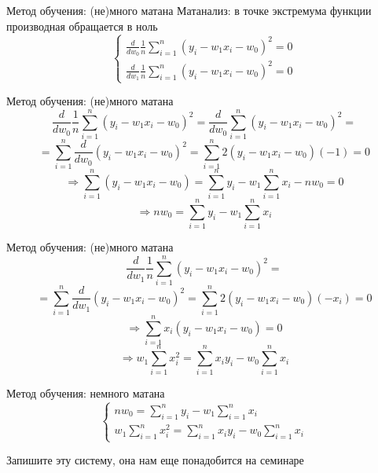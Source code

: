 \documentclass[aspectratio=169]{beamer}
\begin{document}
\begin{frame}{Метод обучения: (не)много матана}
    Матанализ: в точке экстремума функции производная обращается в ноль
    {\LARGE \[
        \begin{cases}
            \frac{d}{dw_0} \frac{1}{n} \sum_{i=1}^n {(y_i - w_1 x_i - w_0)}^2 = 0 \\
            \frac{d}{dw_1} \frac{1}{n} \sum_{i=1}^n {(y_i - w_1 x_i - w_0)}^2 = 0 
        \end{cases}
    \]}
\end{frame}

\begin{frame}{Метод обучения: (не)много матана}
    \large
    \[
        \frac{d}{dw_0} \frac{1}{n} \sum_{i=1}^n {(y_i - w_1 x_i - w_0)}^2 =
        \frac{d}{dw_0} \sum_{i=1}^n {(y_i - w_1 x_i - w_0)}^2 =
    \]
    \pause{}
    \[
        = \sum_{i=1}^n \frac{d}{dw_0} {(y_i - w_1 x_i - w_0)}^2 =
        \sum_{i=1}^n 2 {(y_i - w_1 x_i - w_0)(-1)} = 0
    \]
    \pause{}
    \[
        \Rightarrow \sum_{i=1}^n (y_i - w_1 x_i - w_0) =
        \sum_{i=1}^n y_i - w_1 \sum_{i=1}^n x_i - n w_0 = 0
    \]
    \pause{}
    \[
        \Rightarrow n w_0 = \sum_{i=1}^n y_i - w_1 \sum_{i=1}^n x_i
    \]
\end{frame}

\begin{frame}{Метод обучения: (не)много матана}
    \large
    \[ \frac{d}{dw_1} \frac{1}{n} \sum_{i=1}^n {(y_i - w_1 x_i - w_0)}^2 = \]
    \pause{}
    \[
        = \sum_{i=1}^n \frac{d}{dw_1} {(y_i - w_1 x_i - w_0)}^2 =
        \sum_{i=1}^n 2 {(y_i - w_1 x_i - w_0)(-x_i)} = 0
    \]
    \pause{}
    \[
        \Rightarrow \sum_{i=1}^n x_i {(y_i - w_1 x_i - w_0)} = 0 
    \]
    \pause{}
    \[
        \Rightarrow w_1 \sum_{i=1}^n x_i^2 = \sum_{i=1}^n x_i y_i -
        w_0 \sum_{i=1}^n x_i   
    \]
\end{frame}

\begin{frame}{Метод обучения: немного матана}
    \LARGE
    \[
        \begin{cases}
            n w_0 = \sum_{i=1}^n y_i - w_1 \sum_{i=1}^n x_i \\
            w_1 \sum_{i=1}^n x_i^2 = \sum_{i=1}^n x_i y_i -
            w_0 \sum_{i=1}^n x_i
        \end{cases}
    \]

    {\large Запишите эту систему, она нам еще понадобится на семинаре}
\end{frame}
\end{document}
